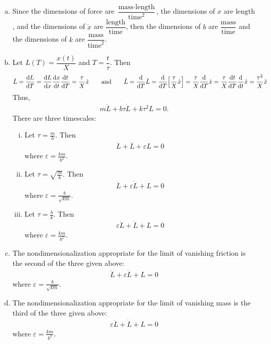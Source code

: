 \documentclass{article} %
\theoremstyle{plain}
\newcommand{\E}{\varepsilon}
\numberwithin{equation}{section} %
\numberwithin{figure}{section} %
\numberwithin{table}{section} %
\begin{document}
\begin{enumerate}[(a)]
    \item
        Since the dimensions of force are $\dfrac{\text{mass}\cdot\text{length}}{\text{time}^2}$, the dimensions of $x$ are $\text{length}$, and the dimensions of $\dot{x}$ are $\dfrac{\text{length}}{\text{time}}$, then the dimensions of $b$ are $\dfrac{\text{mass}}{\text{time}}$ and the dimensions of $k$ are $\dfrac{\text{mass}}{\text{time}^2}$.
    \item
        Let $L(T) = \dfrac{x(t)}{X}$ and $T = \dfrac{t}{\tau}$.  Then
        \begin{align*}
            \dot{L} = \frac{\dd L}{\dd T} = \frac{\dd L}{\dd x} \frac{\dd x}{\dd t} \frac{\dd t}{\dd T} = \frac{\tau}{X}\dot{x} \qquad \text{and} \qquad \ddot{L} = \frac{\dd}{\dd T}\dot{L} = \frac{\dd}{\dd T} \qty[\frac{\tau}{X}\dot{x}] = \frac{\tau}{X} \frac{\dd}{\dd T} \dot{x} = \frac{\tau}{X}\frac{\dd t}{\dd T} \frac{\dd}{\dd t}\dot{x} = \frac{\tau^2}{X}\ddot{x}
        \end{align*}
        Thus,
        \begin{align*}
            m\ddot{L} + b\tau\dot{L} + k\tau^2 L = 0.
        \end{align*}
        There are three timescales:
        \begin{enumerate}[(i)]
            \item
                Let $\tau = \frac{m}{b}$.  Then
                \begin{align*}
                    \ddot{L} + \dot{L} + \E L = 0
                \end{align*}
                where $\E = \frac{km}{b^2}$.
            \item
                Let $\tau = \sqrt{\frac{m}{k}}$.  Then
                \begin{align*}
                    \ddot{L} + \E\dot{L} + L = 0
                \end{align*}
                where $\E = \frac{b}{\sqrt{km}}$.
            \item
                Let $\tau = \frac{b}{k}$.  Then
                \begin{align*}
                    \E\ddot{L} + \dot{L} + L = 0
                \end{align*}
                where $\E = \frac{km}{b^2}$.
        \end{enumerate}
    \item
        The nondimensionalization appropriate for the limit of vanishing friction is the second of the three given above:
        \begin{align*}
            \ddot{L} + \E\dot{L} + L = 0
        \end{align*}
        where $\E = \frac{b}{\sqrt{km}}$.
    \item
        The nondimensionalization appropriate for the limit of vanishing mass is the third of the three given above:
        \begin{align*}
            \E\ddot{L} + \dot{L} + L = 0
        \end{align*}
        where $\E = \frac{km}{b^2}$.
\end{enumerate}
\end{document}
